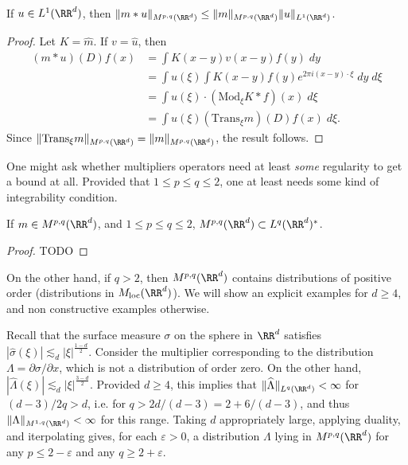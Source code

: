 \begin{theorem}
    If $u \in L^1(\RR^d)$, then $\| m * u \|_{M^{p,q}(\RR^d)} \leq \| m \|_{M^{p,q}(\RR^d)} \| u \|_{L^1(\RR^d)}$.
\end{theorem}
\begin{proof}
    Let $K = \widehat{m}$. If $v = \widehat{u}$, then
    \begin{align*}
        (m * u)(D) f(x) &= \int K(x-y) v(x-y) f(y)\; dy\\
        &= \int u(\xi) \int K(x-y) f(y) e^{2 \pi i (x - y) \cdot \xi}\; dy\; d\xi\\
        &= \int u(\xi) \cdot (\text{Mod}_\xi K * f)(x)\; d\xi\\
        &= \int u(\xi) (\text{Trans}_\xi m)(D) f(x)\; d\xi.
    \end{align*}
    Since $\| \text{Trans}_\xi m \|_{M^{p,q}(\RR^d)} = \| m \|_{M^{p,q}(\RR^d)}$, the result follows.
\end{proof}

One might ask whether multipliers operators need at least \emph{some} regularity to get a bound at all. Provided that $1 \leq p \leq q \leq 2$, one at least needs some kind of integrability condition.

\begin{theorem}
    If $m \in M^{p,q}(\RR^d)$, and $1 \leq p \leq q \leq 2$, $M^{p,q}(\RR^d) \subset L^q(\RR^d)^*$.
\end{theorem}
\begin{proof}
    TODO
\end{proof}

On the other hand, if $q > 2$, then $M^{p,q}(\RR^d)$ contains distributions of positive order (distributions in $M_{\text{loc}}(\RR^d)$). We will show an explicit examples for $d \geq 4$, and non constructive examples otherwise.

\begin{example}
    Recall that the surface measure $\sigma$ on the sphere in $\RR^d$ satisfies $|\widehat{\sigma}(\xi)| \lesssim_d |\xi|^{\frac{1-d}{2}}$. Consider the multiplier corresponding to the distribution $\Lambda = \partial \sigma / \partial x$, which is not a distribution of order zero. On the other hand, $|\widehat{\Lambda}(\xi)| \lesssim_d |\xi|^{\frac{3-d}{2}}$. Provided $d \geq 4$, this implies that $\| \widehat{\Lambda} \|_{L^q(\RR^d)} < \infty$ for $(d-3)/2 q > d$, i.e. for $q > 2d/(d-3) = 2 + 6/(d-3)$, and thus $\| \Lambda \|_{M^{1,q}(\RR^d)} < \infty$ for this range. Taking $d$ appropriately large, applying duality, and iterpolating gives, for each $\varepsilon > 0$, a distribution $\Lambda$ lying in $M^{p,q}(\RR^d)$ for any $p \leq 2 - \varepsilon$ and any $q \geq 2 + \varepsilon$.
\end{example}

